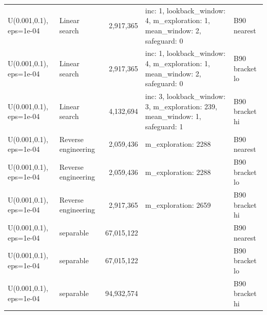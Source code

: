 \begin{tabular}{llrll}
U(0.001,0.1), eps=1e-04 & Linear search & 2,917,365 & inc: 1, lookback\_window: 4, m\_exploration: 1, mean\_window: 2, safeguard: 0 & B90 nearest \\
U(0.001,0.1), eps=1e-04 & Linear search & 2,917,365 & inc: 1, lookback\_window: 4, m\_exploration: 1, mean\_window: 2, safeguard: 0 & B90 bracket lo \\
U(0.001,0.1), eps=1e-04 & Linear search & 4,132,694 & inc: 3, lookback\_window: 3, m\_exploration: 239, mean\_window: 1, safeguard: 1 & B90 bracket hi \\
U(0.001,0.1), eps=1e-04 & Reverse engineering & 2,059,436 & m\_exploration: 2288 & B90 nearest \\
U(0.001,0.1), eps=1e-04 & Reverse engineering & 2,059,436 & m\_exploration: 2288 & B90 bracket lo \\
U(0.001,0.1), eps=1e-04 & Reverse engineering & 2,917,365 & m\_exploration: 2659 & B90 bracket hi \\
U(0.001,0.1), eps=1e-04 & separable & 67,015,122 &  & B90 nearest \\
U(0.001,0.1), eps=1e-04 & separable & 67,015,122 &  & B90 bracket lo \\
U(0.001,0.1), eps=1e-04 & separable & 94,932,574 &  & B90 bracket hi \\
\bottomrule
\end{tabular}
